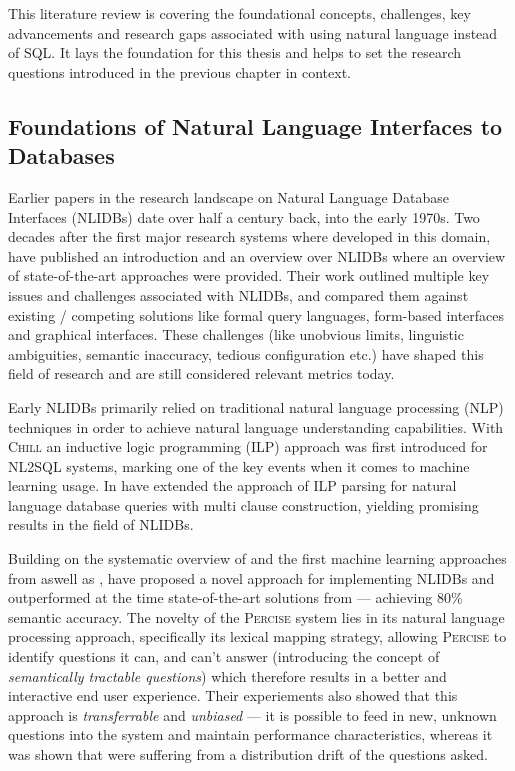 \documentclass{article}
\begin{document}
This literature review is covering the foundational concepts, challenges, key advancements and research gaps
associated with using natural language instead of SQL. It lays the foundation for this thesis and helps to set
the research questions introduced in the previous chapter in context.


\subsection{Foundations of Natural Language Interfaces to Databases}

Earlier papers in the research landscape on Natural Language Database Interfaces (NLIDBs) date over half
a century back, into the early 1970s. Two decades after the first major research systems where developed
in this domain, \citeauthor*{NLIDBs} have published an introduction and an overview over NLIDBs where an overview of
state-of-the-art approaches were provided. \citep{NLIDBs} Their work outlined multiple key issues and challenges
associated with NLIDBs, and compared them against existing / competing solutions like formal query languages,
form-based interfaces and graphical interfaces. These challenges (like unobvious limits, linguistic ambiguities,
semantic inaccuracy, tedious configuration etc.) have shaped this field of research and are still considered relevant
metrics today.

Early NLIDBs primarily relied on traditional natural language processing (NLP) techniques in order to achieve
natural language understanding capabilities. With \textsc{Chill} an inductive logic programming (ILP) approach
was first introduced for NL2SQL systems, marking one of the key events when it comes to machine learning usage.
\citep{ILPParsing} In \citeyear{ILPParsing2} \citeauthor*{ILPParsing2} have extended the approach of ILP
parsing for natural language database queries with multi clause construction, yielding promising results
in the field of NLIDBs. \citep{ILPParsing2}

Building on the systematic overview of \citeauthor*{NLIDBs} and the first machine learning approaches from
\citeauthor*{ILPParsing} aswell as \citeauthor*{ILPParsing2}, \citeauthor{NLIDBTheory} have proposed a novel 
approach for implementing NLIDBs and outperformed at the time state-of-the-art solutions from \cite{ILPParsing} 
\cite{ILPParsing2} — achieving 80\% semantic accuracy. \citep{NLIDBTheory} The novelty of the \textsc{Percise}
system lies in its natural language processing approach, specifically its lexical mapping strategy, allowing 
\textsc{Percise} to identify questions it can, and can't answer (introducing the concept of \textit{semantically 
tractable questions}) which therefore results in a better and interactive end user experience. Their experiements 
also showed that this approach is \textit{transferrable} and \textit{unbiased} — it is possible to feed in new, 
unknown questions into the system and maintain performance characteristics, whereas it was shown that 
\cite{ILPParsing} were suffering from a distribution drift of the questions asked. \citep{NLIDBTheory}
\end{document}
